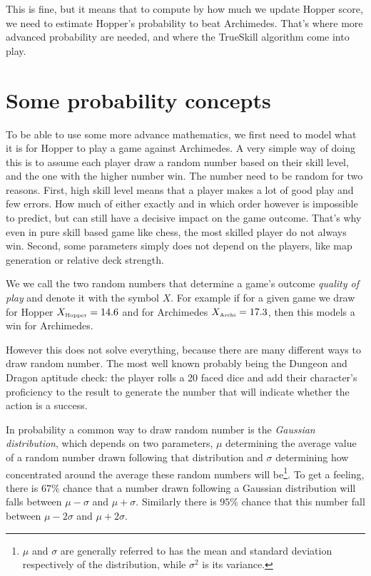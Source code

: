 \documentclass[twocolumn]{article}
\begin{document}
This is fine, but it means that to compute by how much we update Hopper score, we need to estimate Hopper's probability to beat Archimedes. That's where more advanced probability are needed, and where the TrueSkill algorithm come into play.

\section{Some probability concepts}

To be able to use some more advance mathematics, we first need to model what it is for Hopper to play a game against Archimedes. A very simple way of doing this is to assume each player draw a random number based on their skill level, and the one with the higher number win. The number need to be random for two reasons. First, high skill level means that a player makes a lot of good play and few errors. How much of either exactly and in which order however is impossible to predict, but can still have a decisive impact on the game outcome. That's why even in pure skill based game like chess, the most skilled player do not always win. Second, some parameters simply does not depend on the players, like map generation or relative deck strength.

We we call the two random numbers that determine a game's outcome \emph{quality of play} and denote it with the symbol $X$. For example if for a given game we draw for Hopper $X_{\text{\tiny Hopper}} = 14.6$ and for Archimedes $X_{\text{\tiny Archi}} = 17.3$, then this models a win for Archimedes.

However this does not solve everything, because there are many different ways to draw random number. The most well known probably being the Dungeon and Dragon aptitude check: the player rolls a 20 faced dice and add their character's proficiency to the result to generate the number that will indicate whether the action is a success.

In probability a common way to draw random number is the \emph{Gaussian distribution}, which depends on two parameters, $\mu$ determining the average value of a random number drawn following that distribution and $\sigma$ determining how concentrated around the average these random numbers will be\footnote{$\mu$ and $\sigma$ are generally referred to has the mean and standard deviation respectively of the distribution, while $\sigma^2$ is its variance.}. To get a feeling, there is $67\%$ chance that a number drawn following a Gaussian distribution will falls between $\mu - \sigma$ and $\mu + \sigma$. Similarly there is $95\%$ chance that this number fall between $\mu - 2 \sigma$ and $\mu + 2 \sigma$.
\end{document}
